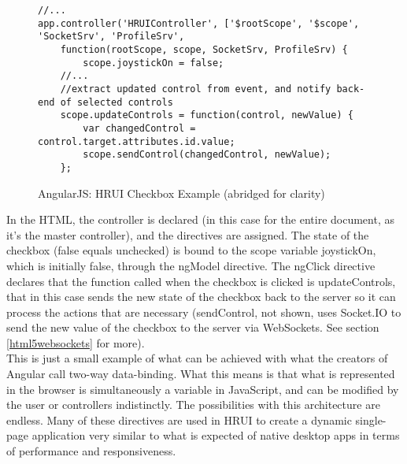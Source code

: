 \begin{figure}[H]
\centering
\captionsetup{justification=centering}
\begin{verbatim}
//...
app.controller('HRUIController', ['$rootScope', '$scope', 'SocketSrv', 'ProfileSrv',
    function(rootScope, scope, SocketSrv, ProfileSrv) {
        scope.joystickOn = false;
    //...
    //extract updated control from event, and notify back-end of selected controls
    scope.updateControls = function(control, newValue) {
        var changedControl = control.target.attributes.id.value;
        scope.sendControl(changedControl, newValue);
    };
\end{verbatim}
\caption{AngularJS: HRUI Checkbox Example (abridged for clarity)}
\end{figure}
In the HTML, the controller is declared (in this case for the entire document, as it's the master controller), and the directives are assigned. The state of the checkbox (false equals unchecked) is bound to the scope variable joystickOn, which is initially false, through the ngModel directive. The ngClick directive declares that the function called when the checkbox is clicked is updateControls, that in this case sends the new state of the checkbox back to the server so it can process the actions that are necessary (sendControl, not shown, uses Socket.IO to send the new value of the checkbox to the server via WebSockets. See section \ref{html5websockets} for more).\\

This is just a small example of what can be achieved with what the creators of Angular call two-way data-binding. What this means is that what is represented in the browser is simultaneously a variable in JavaScript, and can be modified by the user or controllers indistinctly. The possibilities with this architecture are endless. Many of these directives are used in HRUI to create a dynamic single-page application very similar to what is expected of native desktop apps in terms of performance and responsiveness.\\

